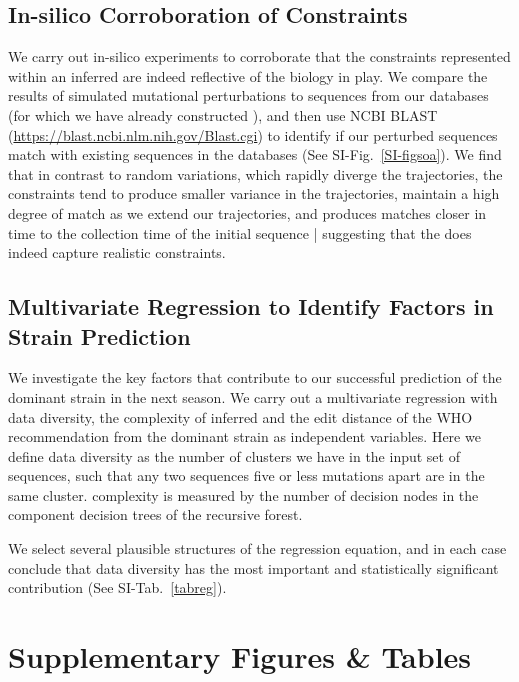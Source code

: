 \documentclass[onecolumn,10pt]{IEEEtran}
\begin{document}
\subsection*{In-silico Corroboration of \qnet Constraints}

We carry out in-silico experiments to corroborate that the constraints represented within an inferred \qnet are indeed reflective of the  biology in play. We compare the results of simulated mutational perturbations to sequences from our databases (for which we have already constructed ), and then use NCBI BLAST (\href{https://blast.ncbi.nlm.nih.gov/Blast.cgi}{https://blast.ncbi.nlm.nih.gov/Blast.cgi}) to identify  if  our perturbed sequences match with existing sequences in the databases (See  SI-Fig.~\ref{SI-figsoa}). We find that in contrast to random variations, which rapidly diverge the trajectories, the \qnet constraints tend to produce smaller variance in the trajectories, maintain a high degree of match as we extend our trajectories, and produces matches closer in time to the collection time of the  initial sequence | suggesting that the \qnet  does indeed capture realistic constraints.









\subsection*{Multivariate Regression to Identify Factors in Strain Prediction}

We investigate the key factors that contribute to our successful prediction of the dominant strain in the next season. We carry out a multivariate regression with data diversity, the complexity of inferred \qnet and the edit distance of the WHO recommendation from the dominant strain as independent variables. Here we define data diversity as the number of clusters we have in the input set of sequences, such that any two sequences five or less mutations apart are in the same cluster. \qnet complexity is measured by the number of decision nodes in the component decision trees of the recursive forest.

We select several plausible structures of the regression equation, and in each case conclude that  data diversity has the most important and statistically significant contribution (See SI-Tab.~\ref{tabreg}).




\clearpage





\section*{Supplementary Figures \& Tables}


\end{document}
